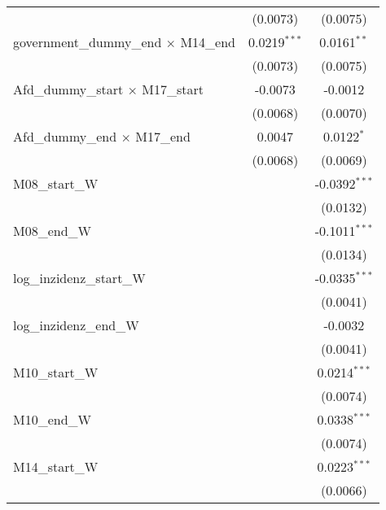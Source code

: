 \documentclass[10pt,a4paper]{article}
\begin{document}
\begin{tabular}{lcc}
                                                    & (0.0073)        & (0.0075)\\   
   government\_dummy\_end $\times$ M14\_end         & 0.0219$^{***}$  & 0.0161$^{**}$\\   
                                                    & (0.0073)        & (0.0075)\\   
   Afd\_dummy\_start $\times$ M17\_start            & -0.0073         & -0.0012\\   
                                                    & (0.0068)        & (0.0070)\\   
   Afd\_dummy\_end $\times$ M17\_end                & 0.0047          & 0.0122$^{*}$\\   
                                                    & (0.0068)        & (0.0069)\\   
   M08\_start\_W                                    &                 & -0.0392$^{***}$\\   
                                                    &                 & (0.0132)\\   
   M08\_end\_W                                      &                 & -0.1011$^{***}$\\   
                                                    &                 & (0.0134)\\   
   log\_inzidenz\_start\_W                          &                 & -0.0335$^{***}$\\   
                                                    &                 & (0.0041)\\   
   log\_inzidenz\_end\_W                            &                 & -0.0032\\   
                                                    &                 & (0.0041)\\   
   M10\_start\_W                                    &                 & 0.0214$^{***}$\\   
                                                    &                 & (0.0074)\\   
   M10\_end\_W                                      &                 & 0.0338$^{***}$\\   
                                                    &                 & (0.0074)\\   
   M14\_start\_W                                    &                 & 0.0223$^{***}$\\   
                                                    &                 & (0.0066)\\   

\end{tabular}
\end{document}
